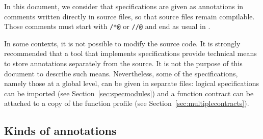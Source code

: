 In this document, we consider that specifications are given as
annotations in comments written directly in \lang{} source files, so that
source files remain compilable. Those comments must start with
\verb|/*@| or \verb|//@| and end as usual in \lang.

In some contexts, it is not possible to modify the source code.
It is strongly recommended that a tool that implements
\NAME{} specifications provide technical means to store annotations
separately from the source. It is not the purpose of this document
to describe such means.  Nevertheless, some of the specifications,
namely those at a global level, can be given in separate files:
logical specifications can be imported (see
Section~\ref{sec:specmodules}) and a function contract can be attached
to a copy of the function profile (see
Section~\ref{sec:multiplecontracts}).

\subsection{Kinds of annotations}

